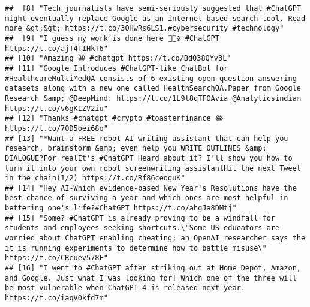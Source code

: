 \documentclass[
]{article}
\begin{document}
\begin{verbatim}
##  [8] "Tech journalists have semi-seriously suggested that #ChatGPT might eventually replace Google as an internet-based search tool. Read more &gt;&gt; https://t.co/3OHwRs6LS1.#cybersecurity #technology"                                                                                                          
##  [9] "I guess my work is done here 🤷🏻‍♀️ #ChatGPT https://t.co/ajT4TIHkT6"                                                                                                                                                                                                                                           
## [10] "Amazing 😆 #chatgpt https://t.co/BdQ38QYv3L"                                                                                                                                                                                                                                                                   
## [11] "Google Introduces #ChatGPT-like ChatBot for #HealthcareMultiMedQA consists of 6 existing open-question answering datasets along with a new one called HealthSearchQA.Paper from Google Research &amp; @DeepMind: https://t.co/1L9t8qTFOAvia @Analyticsindiam https://t.co/v6gKIZV2iu"                          
## [12] "Thanks #chatgpt #crypto #toasterfinance 😂 https://t.co/70D5oei68o"                                                                                                                                                                                                                                            
## [13] "*Want a FREE robot AI writing assistant that can help you research, brainstorm &amp; even help you WRITE OUTLINES &amp; DIALOGUE?For realIt's #ChatGPT Heard about it? I'll show you how to turn it into your own robot screenwriting assistantHit the next Tweet in the chain(1/2) https://t.co/Rf86ceoguK"   
## [14] "Hey AI-Which evidence-based New Year's Resolutions have the best chance of surviving a year and which ones are most helpful in bettering one's life?#ChatGPT https://t.co/ahgJa8DMtj"                                                                                                                          
## [15] "Some? #ChatGPT is already proving to be a windfall for students and employees seeking shortcuts.\"Some US educators are worried about ChatGPT enabling cheating; an OpenAI researcher says the it is running experiments to determine how to battle misuse\" https://t.co/CReuev578F"                          
## [16] "I went to #ChatGPT after striking out at Home Depot, Amazon, and Google. Just what I was looking for! Which one of the three will be most vulnerable when ChatGPT-4 is released next year. https://t.co/iaqV0kfd7m"                                                                                            

\end{verbatim}
\end{document}
